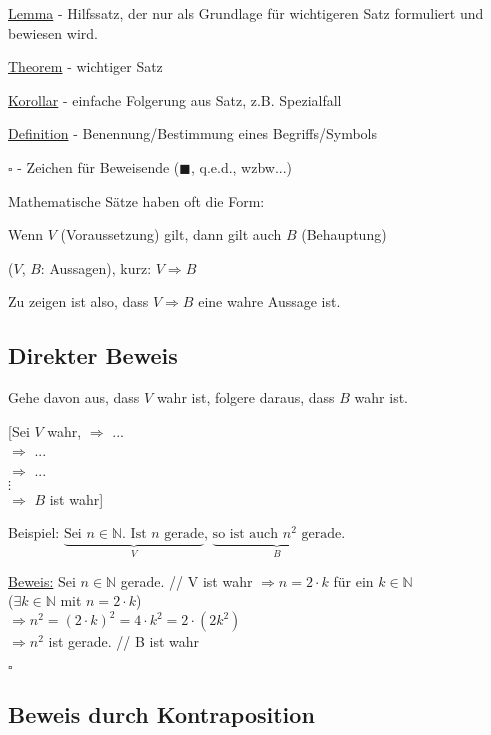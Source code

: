\documentclass[a4paper, 12pt, twoside] {article}
\begin{document}
\underline{Lemma} - Hilfssatz, der nur als Grundlage für wichtigeren Satz formuliert und bewiesen wird.

\underline{Theorem} - wichtiger Satz

\underline{Korollar} - einfache Folgerung aus Satz, z.B. Spezialfall

\underline{Definition} - Benennung/Bestimmung eines Begriffs/Symbols

$\square$ - Zeichen für Beweisende ($\blacksquare$, q.e.d., wzbw...)

\hfill

Mathematische Sätze haben oft die Form:

Wenn $V$ (Voraussetzung) gilt, dann gilt auch $B$ (Behauptung)

($V$, $B$: Aussagen), kurz: $V \Rightarrow B$

Zu zeigen ist also, dass $V \Rightarrow B$ eine wahre Aussage ist.

\subsection{Direkter Beweis}

Gehe davon aus, dass $V$ wahr ist, folgere daraus, dass $B$ wahr ist.

[\space\space Sei $V$ wahr, $\Rightarrow$ ... \\
\text{\qquad\qquad\qquad} $\Rightarrow$ ... \\
\text{\qquad\qquad\qquad} $\Rightarrow$ ... \\
\text{\qquad\qquad\qquad} \space $\vdots$ \\
\text{\qquad\qquad\qquad} $\Rightarrow$ $B$ ist wahr\space\space]

Beispiel: $\underbrace{\text{Sei $n \in \mathbb{N}$. Ist $n$ gerade}}_{V}$, $\underbrace{\text{so ist auch $n^2$ gerade}}_{B}.$

\underline{Beweis:} Sei $n \in \mathbb{N}$ gerade. \hfill // V ist wahr
$\Rightarrow n = 2 \cdot k$ für ein $k \in \mathbb{N}$ \\
\text{\qquad\qquad} ($\exists k \in \mathbb{N}$ mit $n = 2 \cdot k$) \\
$\Rightarrow n^2 = (2 \cdot k)^2 = 4 \cdot k^2 = 2 \cdot (2k^2)$ \\
$\Rightarrow n^2$ ist gerade. \hfill // B ist wahr

\hfill $\square$

\subsection{Beweis durch Kontraposition}
\end{document}
